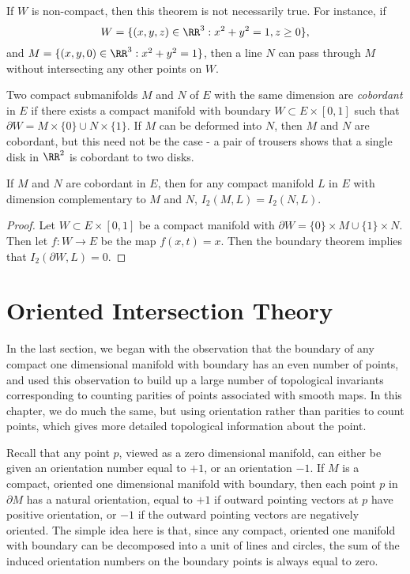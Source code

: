 \begin{remark}
    If $W$ is non-compact, then this theorem is not necessarily true. For instance, if
    \[ W = \{ (x,y,z) \in \RR^3: x^2 + y^2 = 1, z \geq 0 \}, \]
    and $M = \{ (x,y,0) \in \RR^3: x^2 + y^2 = 1 \}$, then a line $N$ can pass through $M$ without intersecting any other points on $W$.
\end{remark}

Two compact submanifolds $M$ and $N$ of $E$ with the same dimension are \emph{cobordant} in $E$ if there exists a compact manifold with boundary $W \subset E \times [0,1]$ such that $\partial W = M \times \{ 0 \} \cup N \times \{ 1 \}$. If $M$ can be deformed into $N$, then $M$ and $N$ are cobordant, but this need not be the case - a pair of trousers shows that a single disk in $\RR^2$ is cobordant to two disks.

\begin{theorem}
    If $M$ and $N$ are cobordant in $E$, then for any compact manifold $L$ in $E$ with dimension complementary to $M$ and $N$, $I_2(M,L) = I_2(N,L)$.
\end{theorem}
\begin{proof}
    Let $W \subset E \times [0,1]$ be a compact manifold with $\partial W = \{ 0 \} \times M \cup \{ 1 \} \times N$. Then let $f: W \to E$ be the map $f(x,t) = x$. Then the boundary theorem implies that $I_2(\partial W,L) = 0$.
\end{proof}

\section{Oriented Intersection Theory}

In the last section, we began with the observation that the boundary of any compact one dimensional manifold with boundary has an even number of points, and used this observation to build up a large number of topological invariants corresponding to counting parities of points associated with smooth maps. In this chapter, we do much the same, but using orientation rather than parities to count points, which gives more detailed topological information about the point.

Recall that any point $p$, viewed as a zero dimensional manifold, can either be given an orientation number equal to $+1$, or an orientation $-1$. If $M$ is a compact, oriented one dimensional manifold with boundary, then each point $p$ in $\partial M$ has a natural orientation, equal to $+1$ if outward pointing vectors at $p$ have positive orientation, or $-1$ if the outward pointing vectors are negatively oriented. The simple idea here is that, since any compact, oriented one manifold with boundary can be decomposed into a unit of lines and circles, the sum of the induced orientation numbers on the boundary points is always equal to zero.

